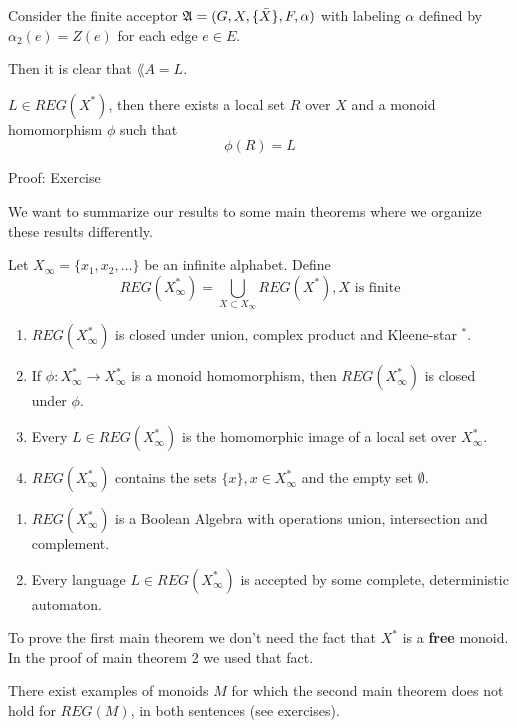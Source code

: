 Consider the finite acceptor $\mbox{$\mathfrak{A}$} = (G, X, \{\bar{X}\}, F, \alpha)$ with
labeling $\alpha$ defined by $\alpha_2(e) = Z(e)$ for each edge $e \in E$.

Then it is clear that $\lang{A} = L$.

\begin{lemma}
$L \in REG(X^*)$, then there exists a local set $R$ over $X$ and a monoid
homomorphism $\phi$ such that \[ \phi(R) = L \]
\end{lemma}

Proof: Exercise

We want to summarize our results to some main theorems where we organize these
results differently.

Let $X_\infty = \{ x_1, x_2, \ldots \}$ be an infinite alphabet. Define \[
REG(X_\infty^*) = \bigcup_{X	\subset X_\infty} REG(X^*), \mbox{$X$ is finite}
\]

\begin{maintheorem}
\begin{enumerate}
  \item $REG(X_\infty^*)$ is closed under union, complex product and
  Kleene-star $^*$.
  \item If $\phi : X_\infty^* \to X_\infty^*$ is a monoid homomorphism, then
$REG(X_\infty^*)$ is closed under $\phi$.
	\item Every $L \in REG(X_\infty^*)$ is the homomorphic image of a local set
	over $X_\infty^*$.
	\item $REG(X_\infty^*)$	 contains the sets $\{x\}, x \in X_\infty^*$ and the
	empty set $\emptyset$.
\end{enumerate}
\end{maintheorem}

\begin{maintheorem}
\begin{enumerate}
  \item $REG(X_\infty^*)$ is a Boolean Algebra with operations union, intersection and
complement. 
	\item Every language $L \in REG(X_\infty^*)$ is accepted by some complete,
deterministic automaton.
\end{enumerate}
\end{maintheorem}

To prove the first main theorem we don't need the fact that $X^*$ is a {\bf
free} monoid. In the proof of main theorem 2 we used that fact.

There exist examples of monoids $M$ for which the second main theorem does not
hold for $REG(M)$, in both sentences (see exercises).

